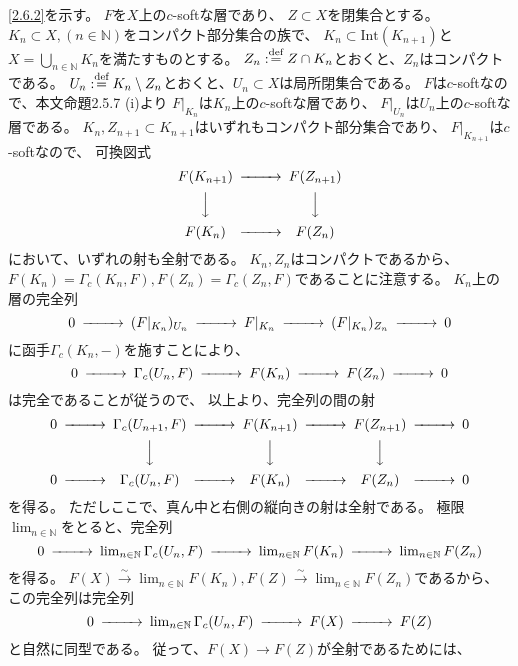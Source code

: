 \documentclass[uplatex,dvipdfmx]{jsarticle}
\makeatletter
\theoremstyle{definition}
\renewenvironment{proof}[1][\proofname]{
  \pushQED{\qed}%
  \normalfont \topsep6\p@\@plus6\p@\relax
  \trivlist
  \item[\hskip\labelsep
    #1\@addpunct{\textbf{.}}]\ignorespaces
}{%
  \popQED\endtrivlist\@endpefalse
}
\providecommand{\proofname}{証明}
\newcommand\N{\mathbb{N}}
\def\dfn{:\overset{\mbox{{\scriptsize def}}}{=}}
\makeatother
\begin{document}
\begin{proof}
  \ref{2.6.2}を示す。
  \(F\)を\(X\)上の\(c\)-softな層であり、
  \(Z\subset X\)を閉集合とする。
  \(K_n\subset X, (n\in \N)\)をコンパクト部分集合の族で、
  \(K_n\subset \mathrm{Int}(K_{n+1})\)と
  \(X = \bigcup_{n\in \N}K_n\)を満たすものとする。
  \(Z_n\dfn Z\cap K_n\)とおくと、\(Z_n\)はコンパクトである。
  \(U_n\dfn K_n\setminus Z_n\)とおくと、\(U_n\subset X\)は局所閉集合である。
  \(F\)は\(c\)-softなので、本文命題2.5.7 (i)より
  \(F|_{K_n}\)は\(K_n\)上の\(c\)-softな層であり、
  \(F|_{U_n}\)は\(U_n\)上の\(c\)-softな層である。
  \(K_n,Z_{n+1}\subset K_{n+1}\)はいずれもコンパクト部分集合であり、
  \(F|_{K_{n+1}}\)は\(c\)-softなので、
  可換図式
  \[
  \begin{CD}
    F(K_{n+1}) @>>> F(Z_{n+1}) \\
    @VVV @VVV \\
    F(K_n) @>>> F(Z_n)
  \end{CD}
  \]
  において、いずれの射も全射である。
  \(K_n,Z_n\)はコンパクトであるから、
  \(F(K_n) = \Gamma_c(K_n,F), F(Z_n) = \Gamma_c(Z_n,F)\)であることに注意する。
  \(K_n\)上の層の完全列
  \[
  \begin{CD}
    0 @>>> (F|_{K_n})_{U_n} @>>> F|_{K_n} @>>> (F|_{K_n})_{Z_n} @>>> 0
  \end{CD}
  \]
  に函手\(\Gamma_c(K_n,-)\)を施すことにより、
  \[
  \begin{CD}
    0 @>>> \Gamma_c(U_n,F) @>>> F(K_n) @>>> F(Z_n) @>>> 0
  \end{CD}
  \]
  は完全であることが従うので、
  以上より、完全列の間の射
  \[
  \begin{CD}
    0 @>>> \Gamma_c(U_{n+1},F) @>>> F(K_{n+1}) @>>> F(Z_{n+1}) @>>> 0 \\
    @. @VVV @VVV @VVV @. \\
    0 @>>> \Gamma_c(U_n,F) @>>> F(K_n) @>>> F(Z_n) @>>> 0
  \end{CD}
  \]
  を得る。
  ただしここで、真ん中と右側の縦向きの射は全射である。
  極限\(\lim_{n\in \N}\)をとると、完全列
  \[
  \begin{CD}
    0 @>>> \lim_{n\in \N}\Gamma_c(U_n,F) @>>>
    \lim_{n\in \N}F(K_n) @>>> \lim_{n\in \N}F(Z_n)
  \end{CD}
  \]
  を得る。
  \(F(X) \xrightarrow{\sim} \lim_{n\in \N} F(K_n),
  F(Z) \xrightarrow{\sim} \lim_{n\in \N} F(Z_n)\)であるから、
  この完全列は完全列
  \[
  \begin{CD}
    0 @>>> \lim_{n\in \N}\Gamma_c(U_n,F) @>>> F(X) @>>> F(Z)
  \end{CD}
  \]
  と自然に同型である。
  従って、\(F(X)\to F(Z)\)が全射であるためには、

\end{proof}
\end{document}
